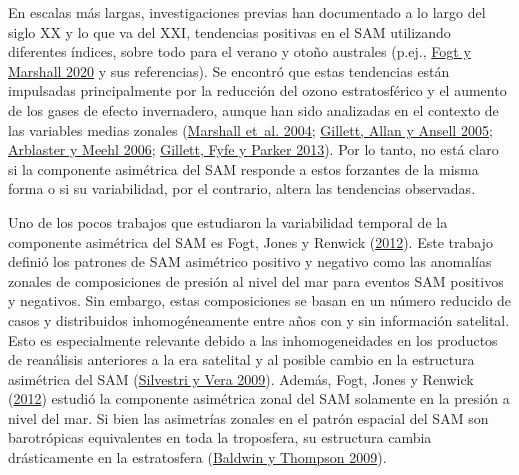 \documentclass[12pt,oneside,a4paper]{reedthesis}
\begin{document}
En escalas más largas, investigaciones previas han documentado a lo largo del siglo XX y lo que va del XXI, tendencias positivas en el SAM utilizando diferentes índices, sobre todo para el verano y otoño australes (p.ej., \protect\hyperlink{ref-fogt2020}{Fogt y Marshall 2020} y sus referencias).
Se encontró que estas tendencias están impulsadas principalmente por la reducción del ozono estratosférico y el aumento de los gases de efecto invernadero, aunque han sido analizadas en el contexto de las variables medias zonales (\protect\hyperlink{ref-marshall2004}{Marshall et~al. 2004}; \protect\hyperlink{ref-gillett2005}{Gillett, Allan y Ansell 2005}; \protect\hyperlink{ref-arblaster2006}{Arblaster y Meehl 2006}; \protect\hyperlink{ref-gillett2013}{Gillett, Fyfe y Parker 2013}).
Por lo tanto, no está claro si la componente asimétrica del SAM responde a estos forzantes de la misma forma o si su variabilidad, por el contrario, altera las tendencias observadas.

Uno de los pocos trabajos que estudiaron la variabilidad temporal de la componente asimétrica del SAM es Fogt, Jones y Renwick (\protect\hyperlink{ref-fogt2012}{2012}).
Este trabajo definió los patrones de SAM asimétrico positivo y negativo como las anomalías zonales de composiciones de presión al nivel del mar para eventos SAM positivos y negativos.
Sin embargo, estas composiciones se basan en un número reducido de casos y distribuidos inhomogéneamente entre años con y sin información satelital.
Esto es especialmente relevante debido a las inhomogeneidades en los productos de reanálisis anteriores a la era satelital y al posible cambio en la estructura asimétrica del SAM (\protect\hyperlink{ref-silvestri2009}{Silvestri y Vera 2009}).
Además, Fogt, Jones y Renwick (\protect\hyperlink{ref-fogt2012}{2012}) estudió la componente asimétrica zonal del SAM solamente en la presión a nivel del mar.
Si bien las asimetrías zonales en el patrón espacial del SAM son barotrópicas equivalentes en toda la troposfera, su estructura cambia drásticamente en la estratosfera (\protect\hyperlink{ref-baldwin2009}{Baldwin y Thompson 2009}).
\end{document}
